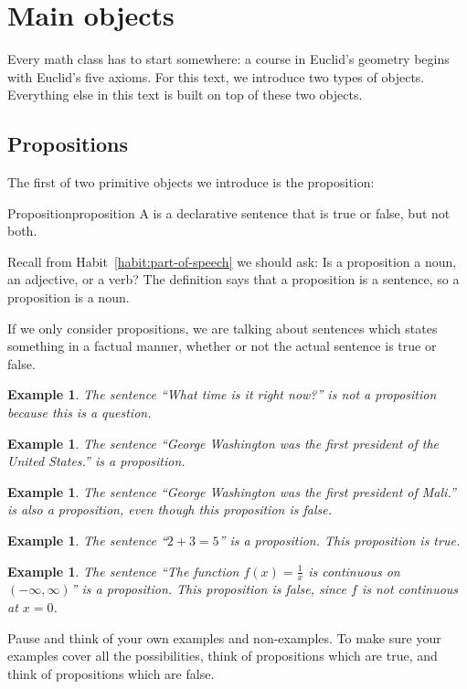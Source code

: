 \documentclass{book}
\newcounter{ekcounter}%
\theoremstyle{ekimcustom}
\newtheorem{example}[ekcounter]{Example}
\newcommand\defn[1]{{\color{blue}{\bf #1}}}
\begin{document}
\section{Main objects}

Every math class has to start somewhere: a course in Euclid's geometry begins with Euclid's five axioms. For this text, we introduce two types of objects. Everything else in this text is built on top of these two objects.

\subsection{Propositions}

The first of two primitive objects we introduce is the proposition:
\begin{bdefinition}{Proposition}{proposition}
A \defn{proposition} is a declarative sentence that is true or false, but not both.
\end{bdefinition}
\begin{blanguage}{}{}
Recall from Habit~\ref{habit:part-of-speech} we should ask: Is a proposition a noun, an adjective, or a verb? The definition says that a proposition is a sentence, so a proposition is a noun.
\end{blanguage}
If we only consider propositions, we are talking about sentences which states something in a factual manner, whether or not the actual sentence is true or false.
\begin{example}
The sentence ``What time is it right now?'' is not a proposition because this is a question.
\end{example}
\begin{example}
The sentence ``George Washington was the first president of the United States.'' \emph{is} a proposition.
\end{example}
\begin{example}
The sentence ``George Washington was the first president of Mali.'' is also a proposition, even though this proposition is false.
\end{example}
\begin{example}
The sentence ``$2+3=5$'' is a proposition. This proposition is true.
\end{example}
\begin{example}
The sentence ``The function $f(x)=\frac{1}{x}$ is continuous on $(-\infty,\infty)$'' is a proposition. This proposition is false, since $f$ is not continuous at $x=0$.
\end{example}
Pause and think of your own examples and non-examples. To make sure your examples cover all the possibilities, think of propositions which are true, and think of propositions which are false.
\end{document}
